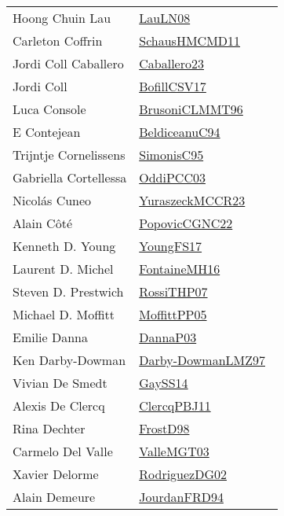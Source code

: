 {\begin{longtable}{p{4cm}p{20cm}}
Hoong Chuin Lau & \href{works/LauLN08.pdf}{LauLN08}~\cite{LauLN08}\\
Carleton Coffrin & \href{works/SchausHMCMD11.pdf}{SchausHMCMD11}~\cite{SchausHMCMD11}\\
Jordi Coll Caballero & \href{works/Caballero23.pdf}{Caballero23}~\cite{Caballero23}\\
Jordi Coll & \href{works/BofillCSV17.pdf}{BofillCSV17}~\cite{BofillCSV17}\\
Luca Console & \href{works/BrusoniCLMMT96.pdf}{BrusoniCLMMT96}~\cite{BrusoniCLMMT96}\\
E Contejean & \href{works/BeldiceanuC94.pdf}{BeldiceanuC94}~\cite{BeldiceanuC94}\\
Trijntje Cornelissens & \href{works/SimonisC95.pdf}{SimonisC95}~\cite{SimonisC95}\\
Gabriella Cortellessa & \href{works/OddiPCC03.pdf}{OddiPCC03}~\cite{OddiPCC03}\\
Nicol{\'{a}}s Cuneo & \href{works/YuraszeckMCCR23.pdf}{YuraszeckMCCR23}~\cite{YuraszeckMCCR23}\\
Alain C{\^{o}}t{\'{e}} & \href{works/PopovicCGNC22.pdf}{PopovicCGNC22}~\cite{PopovicCGNC22}\\
Kenneth D. Young & \href{works/YoungFS17.pdf}{YoungFS17}~\cite{YoungFS17}\\
Laurent D. Michel & \href{works/FontaineMH16.pdf}{FontaineMH16}~\cite{FontaineMH16}\\
Steven D. Prestwich & \href{works/RossiTHP07.pdf}{RossiTHP07}~\cite{RossiTHP07}\\
Michael D. Moffitt & \href{works/MoffittPP05.pdf}{MoffittPP05}~\cite{MoffittPP05}\\
Emilie Danna & \href{works/DannaP03.pdf}{DannaP03}~\cite{DannaP03}\\
Ken Darby{-}Dowman & \href{works/Darby-DowmanLMZ97.pdf}{Darby-DowmanLMZ97}~\cite{Darby-DowmanLMZ97}\\
Vivian De Smedt & \href{works/GaySS14.pdf}{GaySS14}~\cite{GaySS14}\\
Alexis De Clercq & \href{works/ClercqPBJ11.pdf}{ClercqPBJ11}~\cite{ClercqPBJ11}\\
Rina Dechter & \href{works/FrostD98.pdf}{FrostD98}~\cite{FrostD98}\\
Carmelo Del Valle & \href{works/ValleMGT03.pdf}{ValleMGT03}~\cite{ValleMGT03}\\
Xavier Delorme & \href{works/RodriguezDG02.pdf}{RodriguezDG02}~\cite{RodriguezDG02}\\
Alain Demeure & \href{}{JourdanFRD94}~\cite{JourdanFRD94}\\

\end{longtable}}
